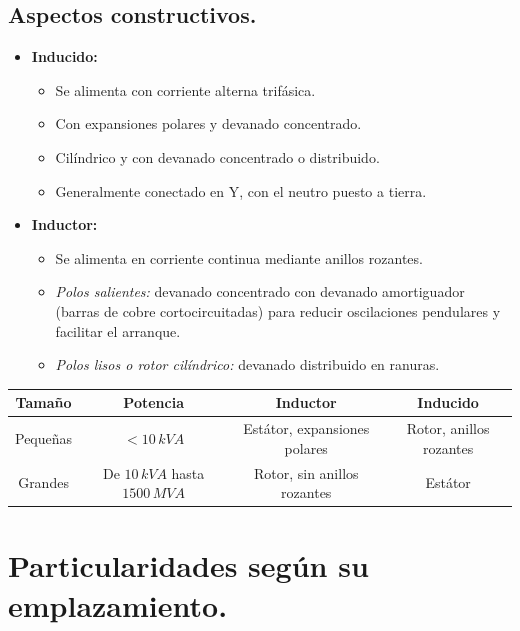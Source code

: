 		\subsection{Aspectos constructivos.}
			\begin{itemize}
				\item \textbf{Inducido:}
					\begin{itemize}
						\item Se alimenta con corriente alterna trifásica.
						\item Con expansiones polares y devanado concentrado.
						\item Cilíndrico y con devanado concentrado o distribuido.
						\item Generalmente conectado en Y, con el neutro puesto a tierra.
					\end{itemize}
				
				\item \textbf{Inductor:}
					\begin{itemize}
						\item Se alimenta en corriente continua mediante anillos rozantes.
						\item \textit{Polos salientes:} devanado concentrado con devanado amortiguador (barras de cobre cortocircuitadas) para reducir oscilaciones pendulares y facilitar el arranque.
						\item \textit{Polos lisos o rotor cilíndrico:} devanado distribuido en ranuras.
					\end{itemize}
			\end{itemize}
				
			\begin{table}[H]
				\centering
				\renewcommand{\arraystretch}{1.1}
				\begin{tabular}{c|ccc}
					\textbf{Tamaño} & \textbf{Potencia} & \textbf{Inductor} & \textbf{Inducido} \\
					\hline
					Pequeñas & $<10\,kV\!A$ & Estátor, expansiones polares & Rotor, anillos rozantes \\
					Grandes & De $10\,kV\!A$ hasta $1500\,MV\!A$ & Rotor, sin anillos rozantes & Estátor\\
				\end{tabular}
			\end{table}		
			
	\section{Particularidades según su emplazamiento.}
